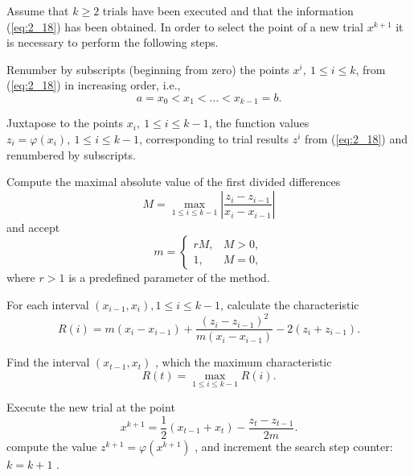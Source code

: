 Assume that $k\geq 2$  trials have been executed and that the information (\ref{eq:2_18}) has been obtained. In order to select the point of a new trial $x^{k+1}$  it is necessary to perform the following steps.
\begin{description}
\item[\textbf{Step 1}]{Renumber by subscripts (beginning from zero) the points $x^i,\:1\leq i\leq k$,  from (\ref{eq:2_18}) in increasing order, i.e.,
\begin{displaymath}
a=x_0<x_1<\ldots <x_{k-1}=b.
\end{displaymath} }
\item[\textbf{Step 2}]{Juxtapose to the points $x_i,\:1\leq i\leq k-1$,  the function values $z_i=\varphi(x_i),\:1\leq i\leq k-1$,  corresponding to trial results $z^i$  from (\ref{eq:2_18}) and renumbered by subscripts.}
\item[\textbf{Step 3}]{Compute the maximal absolute value of the first divided differences 
\begin{displaymath}
M=\max_{1\leq i\leq k-1}\left|\frac{z_i-z_{i-1}}{x_i-x_{i-1}}\right|
\end{displaymath}
and accept
\begin{equation}
\label{eq:2_19}
m =\begin{cases}
    rM, & M>0, \\
    1, & M=0,
  \end{cases} 
\end{equation}
where $r>1$ is a predefined parameter of the method. } %
\item[\textbf{Step 4}]{For each interval $(x_{i-1},x_i),1\leq i\leq k-1$,  calculate the characteristic
\begin{displaymath}
R(i)=m(x_i-x_{i-1})+\frac{(z_i-z_{i-1})^2}{m(x_i-x_{i-1})}-2(z_i+z_{i-1}).
\end{displaymath} } %
\item[\textbf{Step 5}]{Find the interval $(x_{t-1},x_t)$ , which the maximum characteristic
\begin{equation}
\label{eq:2_20}
R(t)=\max_{1\leq i\leq {k-1}}R(i).
\end{equation}  } %
\item[\textbf{Step 6}]{Execute the new trial at the point 
\begin{displaymath}
x^{k+1}=\frac{1}{2}(x_{t-1}+x_t) - \frac{z_t-z_{t-1}}{2m}.
\end{displaymath}
compute the value $z^{k+1}=\varphi(x^{k+1})$ , and increment the search step counter: $k=k+1$  .
} %
\end{description}


